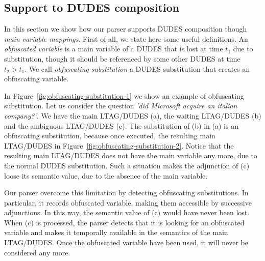 \subsection{Support to DUDES composition}
\label{sec:parsing-support-dudes-composition}

In this section we show how our parser supports DUDES composition though \textit{main variable mappings}.
%
First of all, we state here some useful definitions.
%
An \textit{obfuscated variable} is a main variable of a DUDES that is lost at time $t_{1}$ due to substitution, though it should be referenced by some other DUDES at time $t_{2}>t_{1}$.
%
We call \textit{obfuscating substitution} a DUDES substitution that creates an obfuscating variable.

In Figure~\ref{fig:obfuscating-substitution-1} we show an example of obfuscating substitution. 
%
Let us consider the question \textit{'did Microsoft acquire an italian company?'}.
%
We have the main LTAG/DUDES (a), the waiting LTAG/DUDES (b) and the ambiguous LTAG/DUDES (c).
%
The substitution of (b) in (a) is an obfuscating substitution, because once executed, the resulting main LTAG/DUDES in Figure~\ref{fig:obfuscating-substitution-2}.
%
Notice that the resulting main LTAG/DUDES does not have the main variable any more, due to the normal DUDES substitution.
%
Such a situation makes the adjunction of (c) loose its semantic value, due to the absence of the main variable.

Our parser overcome this limitation by detecting obfuscating substitutions. 
%
In particular, it records obfuscated variable, making them accessible by successive adjunctions.
%
In this way, the semantic value of (c) would have never been lost.
%
When (c) is processed, the parser detects that it is looking for an obfuscated variable and makes it temporally available in the semantics of the main LTAG/DUDES.
%
Once the obfuscated variable have been used, it will never be considered any more.

